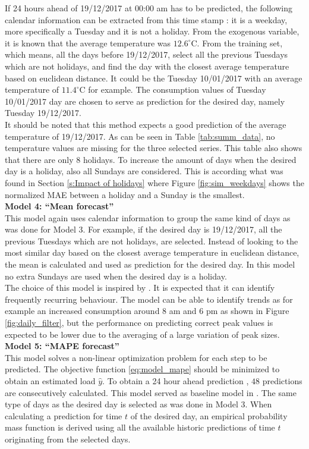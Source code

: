 If 24 hours ahead of 19/12/2017 at 00:00 am has to be predicted, the following calendar information can be extracted from this time stamp : it is a weekday, more specifically a Tuesday and it is not a holiday. From the exogenous variable, it is known that the average temperature was $12.6^\circ$C. From the training set, which means, all the days before 19/12/2017, select all the previous Tuesdays which are not holidays, and find the day with the closest average temperature based on euclidean distance. It could be the Tuesday 10/01/2017 with an average temperature of $11.4^\circ$C for example. The consumption values of Tuesday 10/01/2017 day are chosen to serve as prediction for the desired day, namely Tuesday 19/12/2017.\\ 
It should be noted that this method expects a good prediction of the average temperature of 19/12/2017. As can be seen in Table \ref{tab:summ_data}, no temperature values are missing for the three selected series. This table also shows that there are only  $ 8 $ holidays. To increase the amount of days when the desired day is a holiday, also all Sundays are considered. This is according what was found in Section \ref{s:Impact of holidays} where Figure \ref{fig:sim_weekdays} shows the normalized MAE between a holiday and a Sunday is the smallest. \\

  
 \textbf{Model 4: ``Mean forecast''}\\
 This model again uses calendar information to group the same kind of days as was done for Model 3. For example, if the desired day is 19/12/2017, all the previous Tuesdays which are not holidays, are selected. Instead of looking to the most similar day based on the closest average temperature in euclidean distance, the mean is calculated and used as prediction for the desired day. In this model no extra Sundays are used when the desired day is a holiday.\\
The choice of this model is inspired by \cite{Kong2019}. It is expected that it can identify frequently recurring behaviour. The model can be able to identify trends as for example an increased consumption around $ 8 $ am and $ 6 $ pm as shown in Figure \ref{fig:daily_filter}, but the performance on predicting correct peak values is expected to be lower due to the averaging of a large variation of peak sizes.\\
 
 \textbf{Model 5: ``MAPE forecast'' }\\
 This model solves a non-linear optimization problem for each step to be predicted. The objective function \ref{eq:model_mape} should be minimized to obtain an estimated load $ \hat{y} $. To obtain a 24 hour ahead prediction , $ 48  $ predictions are consecutively calculated. This model served as baseline model in \cite{Kong2019}. The same type of days as the desired day is selected as was done in Model 3. When calculating a prediction for time $ t $ of the desired day, an empirical probability mass function is derived using all the available historic predictions of time $ t $ originating from the selected days.
 
